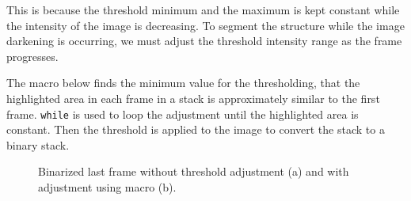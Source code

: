 \documentclass[11pt,a4paper,oneside]{report}
\newcommand{\ilcom}[1]{\texttt{\small#1}}
\begin{document}
This is because the threshold minimum and the maximum is kept constant while the intensity of the image is decreasing. To segment the structure while the image darkening is occurring, we must adjust the threshold intensity range as the frame progresses. 
 
The macro below finds the minimum value for the thresholding, that the highlighted area in each frame in a stack is approximately similar to the first frame. \ilcom{while} is used to loop the adjustment until the highlighted area is constant.  Then the threshold is applied to the image to convert the stack to a binary stack. 



\begin{figure}[htbp]
 \centering
 \caption{Binarized last frame without threshold adjustment (a) and with adjustment using macro (b).}
 \label{fig:ThresholdAdjustResults}
\end{figure}
\end{document}
